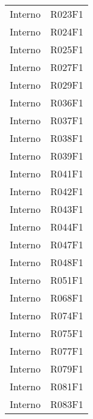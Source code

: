 \documentclass[../analisi-dei-requisiti.tex]{subfiles}
\begin{document}
\begin{center}
\begin{longtable}[H]{ p{3cm} | p{4cm} }
  Interno                       & R023F1                               \\
  Interno                       & R024F1                               \\
  Interno                       & R025F1                               \\
  Interno                       & R027F1                               \\
  Interno                       & R029F1                               \\
  Interno                       & R036F1                               \\
  Interno                       & R037F1                               \\
  Interno                       & R038F1                               \\
  Interno                       & R039F1                               \\
  Interno                       & R041F1                               \\
  Interno                       & R042F1                               \\
  Interno                       & R043F1                               \\
  Interno                       & R044F1                               \\
  Interno                       & R047F1                               \\
  Interno                       & R048F1                               \\
  Interno                       & R051F1                               \\
  Interno                       & R068F1                               \\
  Interno                       & R074F1                               \\
  Interno                       & R075F1                               \\
  Interno                       & R077F1                               \\
  Interno                       & R079F1                               \\
  Interno                       & R081F1                               \\
  Interno                       & R083F1                               \\

\end{longtable}
\end{center}
\end{document}
